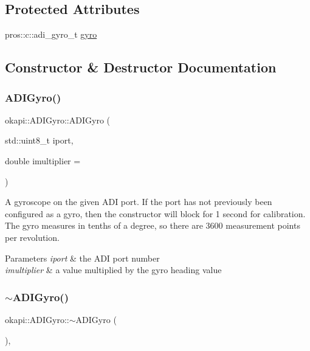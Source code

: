 \subsection*{Protected Attributes}
\begin{DoxyCompactItemize}
\item 
pros\+::c\+::adi\+\_\+gyro\+\_\+t \mbox{\hyperlink{classokapi_1_1ADIGyro_a2ad9717b3e55a829467d9e696de252ac}{gyro}}
\end{DoxyCompactItemize}


\subsection{Constructor \& Destructor Documentation}
\mbox{\label{classokapi_1_1ADIGyro_a04db661121327089b43d82f9aa21e168}} 
\subsubsection{\texorpdfstring{ADIGyro()}{ADIGyro()}}
{\footnotesize\ttfamily okapi\+::\+A\+D\+I\+Gyro\+::\+A\+D\+I\+Gyro (\begin{DoxyParamCaption}\item[{std\+::uint8\+\_\+t}]{iport,  }\item[{double}]{imultiplier = {} }\end{DoxyParamCaption})}

A gyroscope on the given A\+DI port. If the port has not previously been configured as a gyro, then the constructor will block for 1 second for calibration. The gyro measures in tenths of a degree, so there are 3600 measurement points per revolution.


\begin{DoxyParams}{Parameters}
{\em iport} & the A\+DI port number \\
\hline
{\em imultiplier} & a value multiplied by the gyro heading value \\
\hline
\end{DoxyParams}
\mbox{\label{classokapi_1_1ADIGyro_a406cc8ec708c49c507ccab63ffad693c}} 
\subsubsection{\texorpdfstring{$\sim$ADIGyro()}{~ADIGyro()}}
{\footnotesize\ttfamily okapi\+::\+A\+D\+I\+Gyro\+::$\sim$\+A\+D\+I\+Gyro (\begin{DoxyParamCaption}{ }\end{DoxyParamCaption})\hspace{0.3cm}{\ttfamily [virtual]}, {\ttfamily [default]}}



